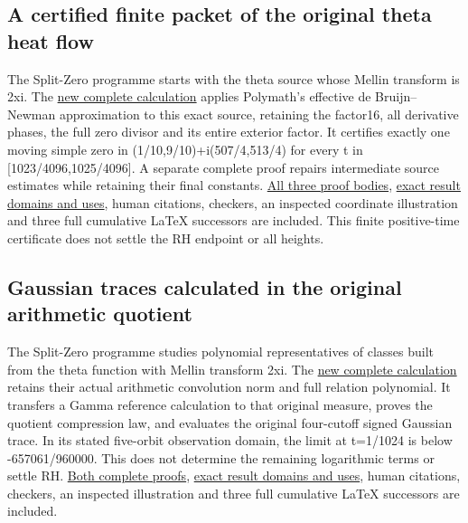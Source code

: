 \documentclass[
]{article}
\begin{document}
\subsection{A certified finite packet of the original theta heat
flow}\label{a-certified-finite-packet-of-the-original-theta-heat-flow}

The Split-Zero programme starts with the theta source whose Mellin
transform is 2xi. The
\href{https://github.com/KokunoYumeto/zeta-function-research-reader/blob/main/workbenches/splitzero-tandem/continuations/20260920-polymath-finite-packet/README.md}{new
complete calculation} applies Polymath's effective de Bruijn--Newman
approximation to this exact source, retaining the factor16, all
derivative phases, the full zero divisor and its entire exterior factor.
It certifies exactly one moving simple zero in
(1/10,9/10)+i(507/4,513/4) for every t in {[}1023/4096,1025/4096{]}. A
separate complete proof repairs intermediate source estimates while
retaining their final constants.
\href{https://github.com/KokunoYumeto/zeta-function-research-reader/blob/main/workbenches/splitzero-tandem/continuations/20260920-polymath-finite-packet/COMPLETE_PROOFS.tex}{All
three proof bodies},
\href{https://github.com/KokunoYumeto/zeta-function-research-reader/blob/main/workbenches/splitzero-tandem/continuations/20260920-polymath-finite-packet/RESULT_INDEX.json}{exact
result domains and uses}, human citations, checkers, an inspected
coordinate illustration and three full cumulative LaTeX successors are
included. This finite positive-time certificate does not settle the RH
endpoint or all heights.

\subsection{Gaussian traces calculated in the original arithmetic
quotient}\label{gaussian-traces-calculated-in-the-original-arithmetic-quotient}

The Split-Zero programme studies polynomial representatives of classes
built from the theta function with Mellin transform 2xi. The
\href{https://github.com/KokunoYumeto/zeta-function-research-reader/blob/main/workbenches/splitzero-tandem/continuations/20260920-gaussian-arithmetic-return/README.md}{new
complete calculation} retains their actual arithmetic convolution norm
and full relation polynomial. It transfers a Gamma reference calculation
to that original measure, proves the quotient compression law, and
evaluates the original four-cutoff signed Gaussian trace. In its stated
five-orbit observation domain, the limit at t=1/1024 is below
-657061/960000. This does not determine the remaining logarithmic terms
or settle RH.
\href{https://github.com/KokunoYumeto/zeta-function-research-reader/blob/main/workbenches/splitzero-tandem/continuations/20260920-gaussian-arithmetic-return/COMPLETE_PROOFS.tex}{Both
complete proofs},
\href{https://github.com/KokunoYumeto/zeta-function-research-reader/blob/main/workbenches/splitzero-tandem/continuations/20260920-gaussian-arithmetic-return/RESULT_INDEX.json}{exact
result domains and uses}, human citations, checkers, an inspected
illustration and three full cumulative LaTeX successors are included.
\end{document}
